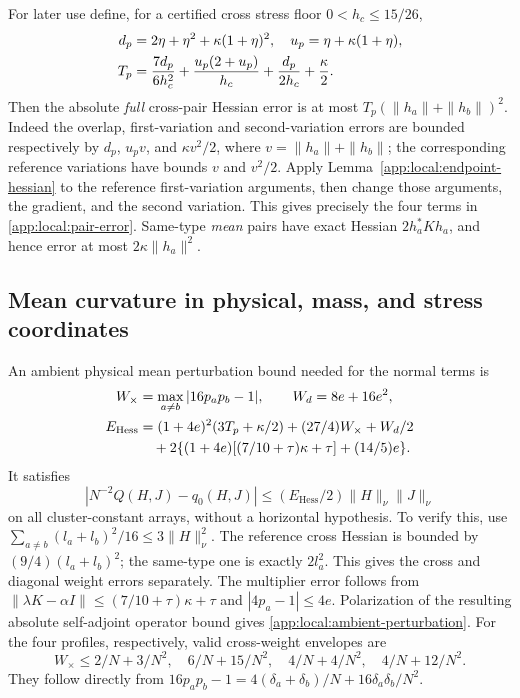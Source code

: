 For later use define, for a certified cross stress floor $0<h_c\le15/26$,
\begin{align}
 d_p&=2\eta+\eta^2+\kappa(1+\eta)^2,\quad
 u_p=\eta+\kappa(1+\eta), \notag\\
 T_p&=\frac{7d_p}{6h_c^2}
       +\frac{u_p(2+u_p)}{h_c}+\frac{d_p}{2h_c}+\frac\kappa2 .
 \label{app:local:pair-error}
\end{align}
Then the absolute \emph{full} cross-pair Hessian error is at most
$T_p(\|h_a\|+\|h_b\|)^2$. Indeed the overlap, first-variation and
second-variation errors are bounded respectively by $d_p$, $u_pv$,
and $\kappa v^2/2$, where $v=\|h_a\|+\|h_b\|$; the corresponding reference
variations have bounds $v$ and $v^2/2$.
Apply Lemma~\ref{app:local:endpoint-hessian} to the reference
first-variation arguments, then change those arguments, the gradient,
and the second variation. This gives precisely the four terms in
\eqref{app:local:pair-error}. Same-type \emph{mean} pairs have exact
Hessian $2h_a^*Kh_a$, and hence error at most $2\kappa\|h_a\|^2$.

\subsection{Mean curvature in physical, mass, and stress coordinates}
\label{app:local:mean}

An ambient physical mean perturbation bound needed for the normal terms is
\begin{align}
 W_\times&=\max_{a\ne b}|16p_ap_b-1|,\qquad W_d=8e+16e^2,\notag\\
 E_{\mathrm{Hess}}&=(1+4e)^2(3T_p+\kappa/2)
       +(27/4)W_\times+W_d/2 \notag\\
 &\quad+2\{(1+4e)[(7/10+\tau)\kappa+\tau]+(14/5)e\}.
 \label{app:local:ambient-P}
\end{align}
It satisfies
\begin{equation}\label{app:local:ambient-perturbation}
 |N^{-2}Q(H,J)-q_0(H,J)|
                  \le(E_{\mathrm{Hess}}/2)\|H\|_\nu\|J\|_\nu
\end{equation}
on all cluster-constant arrays, without a horizontal hypothesis.
To verify this, use
$\sum_{a\ne b}(l_a+l_b)^2/16\le3\|H\|_\nu^2$.
The reference cross Hessian is bounded by $(9/4)(l_a+l_b)^2$;
the same-type one is exactly $2l_a^2$. This gives the cross and diagonal
weight errors separately. The multiplier error follows from
$\|\lambda K-\alpha I\|\le(7/10+\tau)\kappa+\tau$ and
$|4p_a-1|\le4e$. Polarization of the resulting absolute self-adjoint
operator bound gives \eqref{app:local:ambient-perturbation}.
For the four profiles, respectively, valid cross-weight envelopes are
\[
 W_\times\le 2/N+3/N^2,\quad 6/N+15/N^2,\quad
                 4/N+4/N^2,\quad 4/N+12/N^2 .
\]
They follow directly from
$16p_ap_b-1=4(\delta_a+\delta_b)/N+16\delta_a\delta_b/N^2$.


